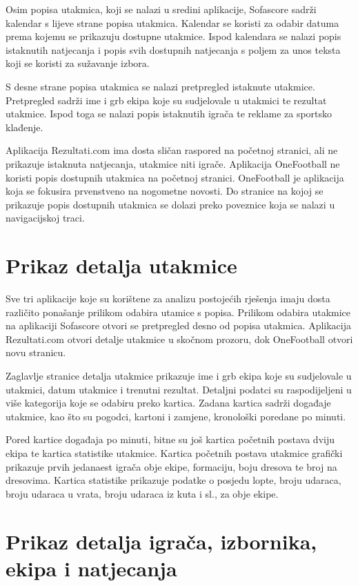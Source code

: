 \documentclass[times, utf8, zavrsni]{fer}
\begin{document}
Osim popisa utakmica, koji se nalazi u sredini aplikacije, Sofascore sadrži kalendar s lijeve strane popisa utakmica.
Kalendar se koristi za odabir datuma prema kojemu se prikazuju dostupne utakmice.
Ispod kalendara se nalazi popis istaknutih natjecanja i popis svih dostupnih natjecanja s poljem za unos teksta koji se koristi za sužavanje izbora.

S desne strane popisa utakmica se nalazi pretpregled istaknute utakmice. Pretpregled sadrži ime i grb ekipa koje su sudjelovale u utakmici te rezultat utakmice.
Ispod toga se nalazi popis istaknutih igrača te reklame za sportsko klađenje.

Aplikacija Rezultati.com ima dosta sličan raspored na početnoj stranici, ali ne prikazuje istaknuta natjecanja, utakmice niti igrače.
Aplikacija OneFootball ne koristi popis dostupnih utakmica na početnoj stranici. OneFootball je aplikacija koja se fokusira prvenstveno na nogometne novosti.
Do stranice na kojoj se prikazuje popis dostupnih utakmica se dolazi preko poveznice koja se nalazi u navigacijskoj traci.

\section{Prikaz detalja utakmice}

Sve tri aplikacije koje su korištene za analizu postojećih rješenja imaju dosta različito ponašanje prilikom odabira utamice s popisa.
Prilikom odabira utakmice na aplikaciji Sofascore otvori se pretpregled desno od popisa utakmica.
Aplikacija Rezultati.com otvori detalje utakmice u skočnom prozoru, dok OneFootball otvori novu stranicu.

Zaglavlje stranice detalja utakmice prikazuje ime i grb ekipa koje su sudjelovale u utakmici, datum utakmice i trenutni rezultat.
Detaljni podatci su raspodijeljeni u više kategorija koje se odabiru preko kartica. Zadana kartica sadrži događaje utakmice, kao što su pogodci, kartoni i zamjene, kronološki poredane po minuti.

Pored kartice događaja po minuti, bitne su još kartica početnih postava dviju ekipa te kartica statistike utakmice.
Kartica početnih postava utakmice grafički prikazuje prvih jedanaest igrača obje ekipe, formaciju, boju dresova te broj na dresovima.
Kartica statistike prikazuje podatke o posjedu lopte, broju udaraca, broju udaraca u vrata, broju udaraca iz kuta i sl., za obje ekipe.

\section{Prikaz detalja igrača, izbornika, ekipa i natjecanja}
\end{document}

